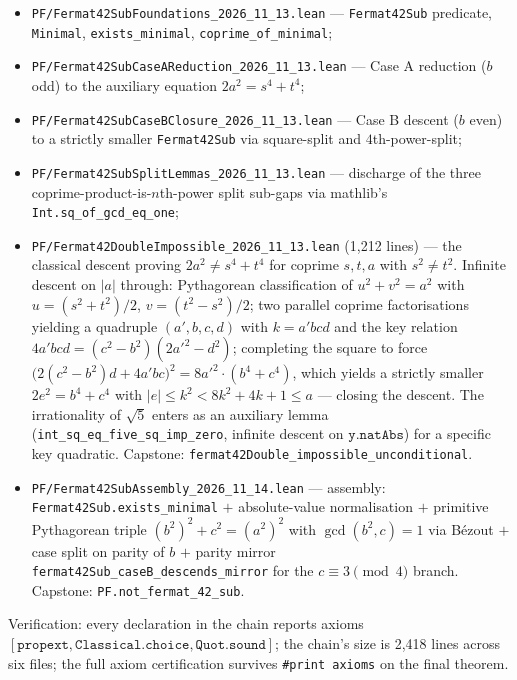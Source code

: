 \begin{itemize}
\item \texttt{PF/Fermat42SubFoundations\_2026\_11\_13.lean} ---
  \texttt{Fermat42Sub} predicate, \texttt{Minimal},
  \texttt{exists\_minimal}, \texttt{coprime\_of\_minimal};
\item \texttt{PF/Fermat42SubCaseAReduction\_2026\_11\_13.lean} --- Case A
  reduction ($b$ odd) to the auxiliary equation $2a^2 = s^4 + t^4$;
\item \texttt{PF/Fermat42SubCaseBClosure\_2026\_11\_13.lean} --- Case B
  descent ($b$ even) to a strictly smaller \texttt{Fermat42Sub} via
  square-split and $4$th-power-split;
\item \texttt{PF/Fermat42SubSplitLemmas\_2026\_11\_13.lean} --- discharge of
  the three coprime-product-is-$n$th-power split sub-gaps via mathlib's
  \texttt{Int.sq\_of\_gcd\_eq\_one};
\item \texttt{PF/Fermat42DoubleImpossible\_2026\_11\_13.lean} (1{,}212 lines)
  --- the classical descent proving $2a^2 \neq s^4 + t^4$ for coprime
  $s, t, a$ with $s^2 \neq t^2$.  Infinite descent on $|a|$ through: Pythagorean
  classification of $u^2 + v^2 = a^2$ with $u = (s^2 + t^2)/2$,
  $v = (t^2 - s^2)/2$; two parallel coprime factorisations yielding a
  quadruple $(a', b, c, d)$ with $k = a'bcd$ and the key relation
  $4a'bcd = (c^2 - b^2)(2a'^2 - d^2)$; completing the square to force
  $\bigl(2(c^2 - b^2)d + 4a'bc\bigr)^2 = 8a'^2 \cdot (b^4 + c^4)$, which
  yields a strictly smaller $2e^2 = b^4 + c^4$ with
  $|e| \le k^2 < 8k^2 + 4k + 1 \le a$ --- closing the descent.  The
  irrationality of $\sqrt{5}$ enters as an auxiliary lemma
  (\texttt{int\_sq\_eq\_five\_sq\_imp\_zero}, infinite descent on
  $\mathtt{y.natAbs}$) for a specific key quadratic.
  Capstone: \texttt{fermat42Double\_impossible\_unconditional}.
\item \texttt{PF/Fermat42SubAssembly\_2026\_11\_14.lean} --- assembly:
  \texttt{Fermat42Sub.exists\_minimal} $+$ absolute-value normalisation $+$
  primitive Pythagorean triple $(b^2)^2 + c^2 = (a^2)^2$ with
  $\gcd(b^2, c) = 1$ via Bézout $+$ case split on parity of $b$ $+$ parity
  mirror \texttt{fermat42Sub\_caseB\_descends\_mirror} for the $c \equiv 3
  \pmod 4$ branch.  Capstone: \texttt{PF.not\_fermat\_42\_sub}.
\end{itemize}

Verification: every declaration in the chain reports axioms
$[\mathtt{propext}, \mathtt{Classical.choice}, \mathtt{Quot.sound}]$; the
chain's size is 2{,}418 lines across six files; the full axiom certification
survives \texttt{\#print axioms} on the final theorem.


